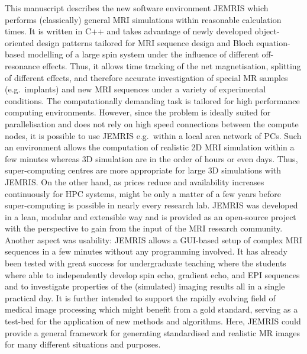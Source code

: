 \documentclass[journal,onecolumn,12pt]{IEEEtran}
\begin{document}
This manuscript describes the new software environment JEMRIS which performs (classically) general MRI simulations
within reasonable calculation times. It is written in C++ and takes advantage of newly developed object-oriented design
patterns tailored for MRI sequence design and Bloch equation-based modelling of a large spin system under the influence
of different off-resonance effects. Thus, it allows time tracking of the net magnetisation, splitting of different
effects, and therefore accurate investigation of special MR samples (e.g.~implants) and new MRI sequences under a
variety of experimental conditions. The computationally demanding task is tailored for high performance computing
environments. However, since the problem is ideally suited for parallelisation and does not rely on high speed
connections between the compute nodes, it is possible to use JEMRIS e.g.~within a local area network of PCs. Such an
environment allows the computation of realistic 2D MRI simulation within a few minutes whereas 3D simulation are in the
order of hours or even days. Thus, super-computing centres are more appropriate for large 3D simulations with JEMRIS. On
the other hand, as prices reduce and availability increases continuously for HPC systems, might be only a matter of a
few years before super-computing is possible in nearly every research lab. JEMRIS was developed in a lean, modular and
extensible way and is provided as an open-source project with the perspective to gain from the input of the MRI research
community. Another aspect was usability: JEMRIS allows a GUI-based setup of complex MRI sequences in a few minutes
without any programming involved. It has already been tested with great success for undergraduate teaching where the
students where able to independently develop spin echo, gradient echo, and EPI sequences and to investigate properties
of the (simulated) imaging results all in a single practical day.  It is further intended to support the rapidly
evolving field of medical image processing which might benefit from a gold standard, serving as a test-bed for the
application of new methods and algorithms. Here, JEMRIS could provide a general framework for generating standardised
and realistic MR images for many different situations and purposes.\\
\end{document}
